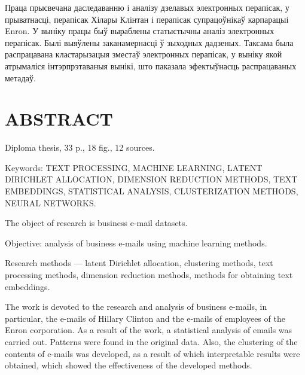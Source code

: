 Праца прысвечана даследаванню і аналізу дзелавых электронных перапісак, у прыватнасці, перапісак Хілары Клінтан і перапісак супрацоўнікаў карпарацыі Enron. У выніку працы быў выраблены статыстычны аналіз электронных перапісак. Былі выяўлены заканамернасці ў зыходных дадзеных. Таксама была распрацавана кластарызацыя зместаў электронных перапісак, у выніку якой атрымаліся інтэрпрэтаваныя вынікі, што паказала эфектыўнасць распрацаваных метадаў.



\chapter*{ABSTRACT}

Diploma thesis, 33 p., 18 fig., 12 sources.

Keywords: TEXT PROCESSING, MACHINE LEARNING, LATENT DIRICHLET ALLOCATION, DIMENSION REDUCTION METHODS, TEXT EMBEDDINGS, STATISTICAL ANALYSIS, CLUSTERIZATION METHODS, NEURAL NETWORKS.

\vspace{1.5 ex}
The object of research is business e-mail datasets.

Objective: analysis of business e-mails using machine learning methods.

Research methods --- latent Dirichlet allocation, clustering methods, text processing methods, dimension reduction methods, methods for obtaining text embeddings.

The work is devoted to the research and analysis of business e-mails, in particular, the e-mails of Hillary Clinton and the e-mails of employees of the Enron corporation. As a result of the work, a statistical analysis of emails was carried out. Patterns were found in the original data. Also, the clustering of the contents of e-mails was developed, as a result of which interpretable results were obtained, which showed the effectiveness of the developed methods.
